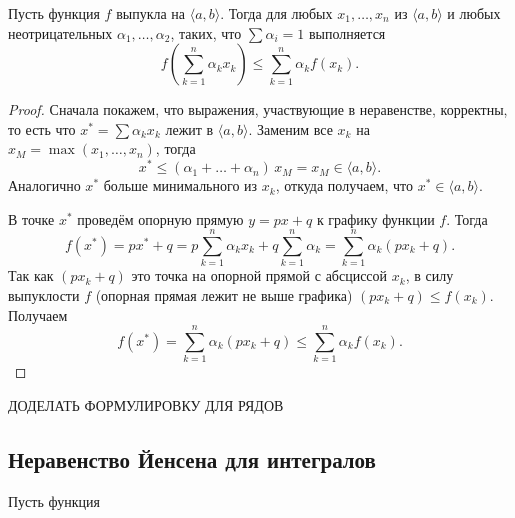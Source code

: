 \begin{theorem}
	Пусть функция \(f\) выпукла на \(\langle a, b \rangle\). Тогда для любых \(x_1, \ldots, x_n\) из \(\langle a, b \rangle\) и любых неотрицательных \(\alpha_1, \ldots, \alpha_2\), таких, что \(\sum \alpha_i = 1\) выполняется \[
		f \left(\sum_{k=1}^n \alpha_k x_k \right) \leqslant \sum_{k=1}^n \alpha_k f(x_k). 
	\]
\end{theorem}
\begin{proof}
	Сначала покажем, что выражения, участвующие в неравенстве, корректны, то есть что \(x^* = \sum \alpha_k x_k\) лежит в  \(\langle a, b \rangle\). Заменим все \(x_k\) на \(x_M = \max(x_1, \ldots, x_n)\), тогда \[
		x^* \leqslant (\alpha_1 + \ldots + \alpha_n) \, x_M = x_M \in \langle a, b \rangle.
	\]
	Аналогично \(x^*\) больше минимального из \(x_k\), откуда получаем, что \(x^* \in \langle a, b \rangle\).
	
	В точке \(x^*\) проведём опорную прямую \(y = px + q\) к графику функции \(f\). Тогда \[
		f(x^*) = px^* + q = p \sum_{k=1}^n \alpha_k x_k + q \sum_{k=1}^n \alpha_k = \sum_{k=1}^n \alpha_k (px_k + q).
	\]
	Так как \((px_k + q)\) это точка на опорной прямой с абсциссой \(x_k\), в силу выпуклости \(f\) (опорная прямая лежит не выше графика) \((px_k + q) \leqslant f(x_k)\). Получаем \[
		f(x^*) = \sum_{k=1}^n \alpha_k (px_k + q) \leqslant \sum_{k=1}^n \alpha_k f(x_k).
	\]
\end{proof}

ДОДЕЛАТЬ ФОРМУЛИРОВКУ ДЛЯ РЯДОВ

\subsection{Неравенство Йенсена для интегралов}

\begin{theorem}
	Пусть функция 
\end{theorem}